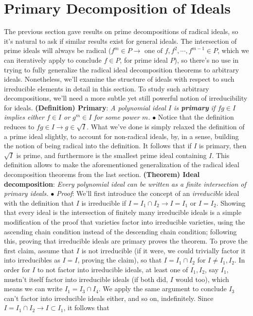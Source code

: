 \documentclass{article}
\newcommand*{\tb}{\textbf}
\newcommand*{\ti}{\textit}
\newcommand*{\n}{\newline}
\newcommand*{\nn}{\newline \newline}
\newcommand*{\Pf}{\indent \ensuremath{\bullet} \textit{Proof}: }
\begin{document}
\section{Primary Decomposition of Ideals}
The previous section gave results on prime decompositions of radical ideals, so it's natural to ask if similar results exist for general ideals. The intersection of prime ideals will always be radical ($ f^m \in P \rightarrow \text{ one of } f, f^2, \cdots, f^{m - 1} \in P $, which we can iteratively apply to conclude $ f \in P $, for prime ideal $ P $), so there's no use in trying to fully generalize the radical ideal decomposition theorems to arbitrary ideals. Nonetheless, we'll examine the structure of ideals with respect to such irreducible elements in detail in this section.
\n
To study such arbitrary decompositions, we'll need a more subtle yet still powerful notion of irreducibility for ideals.
\nn
\tb{(Definition) Primary}: \ti{A polynomial ideal $ I $ is \tb{primary} if $ f g \in I $ implies either $ f \in I $ or $ g^m \in I $ for some power $ m $.}
\n
\indent $ \bullet $ Notice that the definition reduces to $ f g \in I \rightarrow g \in \sqrt{I} $.
\nn
What we've done is simply relaxed the definition of a prime ideal slightly, to account for non-radical ideals, by, in a sense, building the notion of being radical into the definition. It follows that if $ I $ is primary, then $ \sqrt{I} $ is prime, and furthermore is the smallest prime ideal containing $ I $. This definition allows to make the aforementioned generalization of the radical ideal decomposition theorems from the last section.
\nn
\tb{(Theorem) Ideal decomposition}: \ti{Every polynomial ideal can be written as a finite intersection of primary ideals.}
\n
\Pf We'll first introduce the concept of an \ti{irreducible} ideal with the definition that $ I $ is irreducible if $ I = I_1 \cap I_2 \rightarrow I = I_1 \text{ or } I = I_2 $. Showing that every ideal is the intersection of finitely many irreducible ideals is a simple modification of the proof that varieties factor into irreducible varieties, using the ascending chain condition instead of the descending chain condition; following this, proving that irreducible ideals are primary proves the theorem.
\n
To prove the first claim, assume that $ I $ is not irreducible (if it were, we could trivially factor it into irreducibles as $ I = I $, proving the claim), so that $ I = I_1 \cap I_2 $ for $ I \neq I_1, I_2 $. In order for $ I $ to not factor into irreducible ideals, at least one of $ I_1, I_2 $, say $ I_1 $, mustn't itself factor into irreducible ideals (if both did, $ I $ would too), which means we can write $ I_1 = I_3 \cap I_4 $. We apply the same argument to conclude $ I_3 $ can't factor into irreducible ideals either, and so on, indefinitely. Since $ I = I_1 \cap I_2 \rightarrow I \subset I_1 $, it follows that
\end{document}
